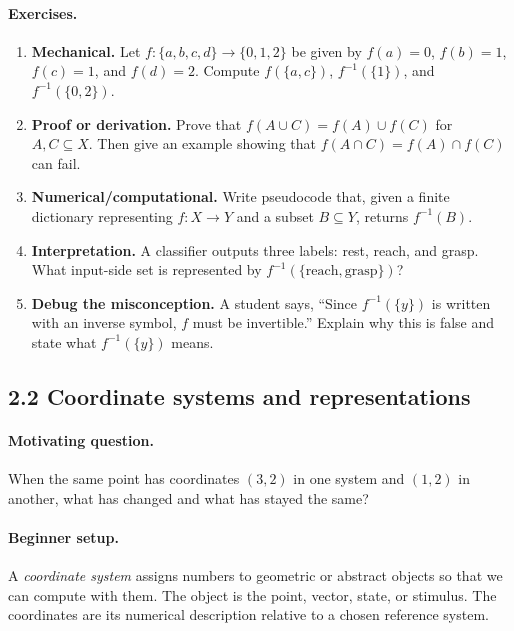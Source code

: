 \paragraph{Exercises.}
\begin{enumerate}[label=\textbf{2.1.\arabic*.}, leftmargin=*]
\item \textbf{Mechanical.} Let \(f:\{a,b,c,d\}\to\{0,1,2\}\) be given by \(f(a)=0\), \(f(b)=1\), \(f(c)=1\), and \(f(d)=2\). Compute \(f(\{a,c\})\), \(f^{-1}(\{1\})\), and \(f^{-1}(\{0,2\})\).
\item \textbf{Proof or derivation.} Prove that \(f(A\cup C)=f(A)\cup f(C)\) for \(A,C\subseteq X\). Then give an example showing that \(f(A\cap C)=f(A)\cap f(C)\) can fail.
\item \textbf{Numerical/computational.} Write pseudocode that, given a finite dictionary representing \(f:X\to Y\) and a subset \(B\subseteq Y\), returns \(f^{-1}(B)\).
\item \textbf{Interpretation.} A classifier outputs three labels: rest, reach, and grasp. What input-side set is represented by \(f^{-1}(\{\text{reach},\text{grasp}\})\)?
\item \textbf{Debug the misconception.} A student says, ``Since \(f^{-1}(\{y\})\) is written with an inverse symbol, \(f\) must be invertible.'' Explain why this is false and state what \(f^{-1}(\{y\})\) means.
\end{enumerate}

\subsection{2.2 Coordinate systems and representations}

\paragraph{Motivating question.}
When the same point has coordinates \((3,2)\) in one system and \((1,2)\) in another, what has changed and what has stayed the same?

\paragraph{Beginner setup.}
A \emph{coordinate system} assigns numbers to geometric or abstract objects so that we can compute with them. The object is the point, vector, state, or stimulus. The coordinates are its numerical description relative to a chosen reference system.

